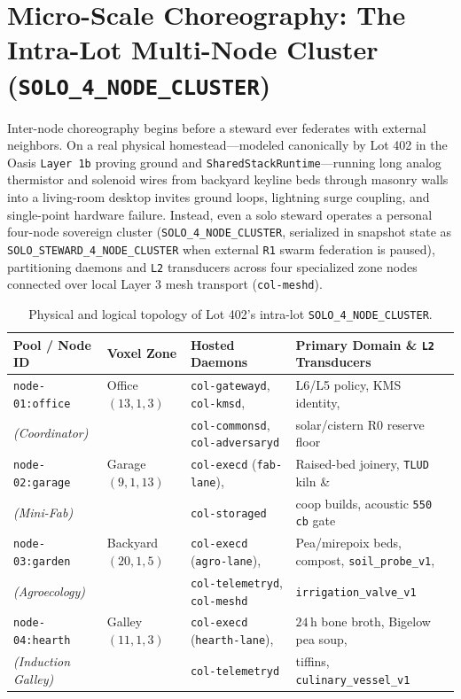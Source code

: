 \section{Micro-Scale Choreography: The Intra-Lot Multi-Node Cluster (\texttt{SOLO\_4\_NODE\_CLUSTER})}
\label{sec:micro-scale-four-node}

Inter-node choreography begins before a steward ever federates with external neighbors. On a
real physical homestead---modeled canonically by Lot 402 in the Oasis \texttt{Layer 1b}
proving ground and \texttt{SharedStackRuntime}---running long analog thermistor and solenoid
wires from backyard keyline beds through masonry walls into a living-room desktop invites
ground loops, lightning surge coupling, and single-point hardware failure. Instead, even a
solo steward operates a personal four-node sovereign cluster (\texttt{SOLO\_4\_NODE\_CLUSTER},
serialized in snapshot state as \texttt{SOLO\_STEWARD\_4\_NODE\_CLUSTER} when external
\texttt{R1} swarm federation is paused), partitioning daemons and \texttt{L2} transducers
across four specialized zone nodes connected over local Layer 3 mesh transport
(\texttt{col-meshd}).

\begin{table}[htbp]
\centering
\caption{Physical and logical topology of Lot 402's intra-lot \texttt{SOLO\_4\_NODE\_CLUSTER}.}
\label{tab:lot402-four-node-cluster}
\footnotesize
\begin{tabular}{@{}llll@{}}
\toprule
\textbf{Pool / Node ID} & \textbf{Voxel Zone} & \textbf{Hosted Daemons} & \textbf{Primary Domain \& \texttt{L2} Transducers} \\
\midrule
\texttt{node-01:office} & Office $(13,1,3)$ & \texttt{col-gatewayd}, \texttt{col-kmsd}, & L6/L5 policy, KMS identity, \\
\textit{(Coordinator)} & & \texttt{col-commonsd}, \texttt{col-adversaryd} & solar/cistern R0 reserve floor \\
\addlinespace[2pt]
\texttt{node-02:garage} & Garage $(9,1,13)$ & \texttt{col-execd} (\texttt{fab-lane}), & Raised-bed joinery, \texttt{TLUD} kiln \& \\
\textit{(Mini-Fab)} & & \texttt{col-storaged} & coop builds, acoustic \texttt{550 cb} gate \\
\addlinespace[2pt]
\texttt{node-03:garden} & Backyard $(20,1,5)$ & \texttt{col-execd} (\texttt{agro-lane}), & Pea/mirepoix beds, compost, \texttt{soil\_probe\_v1}, \\
\textit{(Agroecology)} & & \texttt{col-telemetryd}, \texttt{col-meshd} & \texttt{irrigation\_valve\_v1} \\
\addlinespace[2pt]
\texttt{node-04:hearth} & Galley $(11,1,3)$ & \texttt{col-execd} (\texttt{hearth-lane}), & $24\,\mathrm{h}$ bone broth, Bigelow pea soup, \\
\textit{(Induction Galley)} & & \texttt{col-telemetryd} & tiffins, \texttt{culinary\_vessel\_v1} \\
\bottomrule
\end{tabular}
\end{table}

